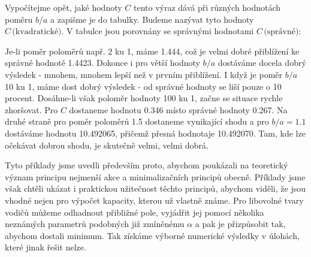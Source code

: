     Vypočítejme opět, jaké hodnoty \(C\) tento výraz dává při různých hodnotách poměru \(b/a\) a
    zapišme je do tabulky. Budeme nazývat tyto hodnoty \(C\,\text{(kvadratické)}\). V tabulce jsou
    porovnány se správnými hodnotami \(C\,\text{(správné)}\):

    \begin{table}[ht!]      %
      \centering
     \end{table}

    Je-li poměr poloměrů např. 2 ku 1, máme \num{1.444}, což je velmi dobré přiblížení ke správné
    hodnotě \num{1.4423}. Dokonce i pro větší hodnoty \(b/a\) dostáváme docela dobrý výsledek -
    mnohem, mnohem lepší než v prvním přiblížení. I když je poměr \(b/a\) 10 ku 1, máme dost dobrý
    výsledek - od správné hodnoty se liší pouze o 10 procent. Dosáhne-li však poloměr hodnoty 100 ku
    1, začne se situace rychle zhoršovat. Pro \(C\) dostaneme hodnotu \num{0.346} místo správné
    hodnoty \num{0.267}. Na druhé straně pro poměr poloměrů \num{1.5} dostaneme vynikající shodu a
    pro \(b/a = \num{1.1}\) dostáváme hodnotu \num{10.492065}, přičemž přesná hodnotaje
    \num{10.492070}. Tam, kde lze očekávat dobrou shodu, je skutečně velmi, velmi dobrá. 
    
    Tyto příklady jsme uvedli především proto, abychom poukázali na teoretický význam principu
    nejmenší akce a minimalizačních principů obecně. Příklady jsme však chtěli ukázat i praktickou
    užitečnost těchto principů, abychom viděli, že jsou vhodné nejen pro výpočet kapacity, kterou už
    vlastně známe. Pro libovolné tvary vodičů můžeme odhadnout přibližné pole, vyjádřit jej pomocí
    několika neznámých parametrů podobných již zmíněnému \(\alpha\) a pak je přizpůsobit tak,
    abychom dostali minimum. Tak získáme výborné numerické výsledky v úlohách, které jinak řešit
    nelze.

